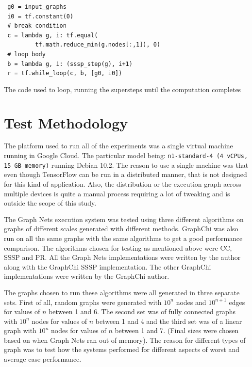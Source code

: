 \documentclass[sigconf,nonacm]{acmart}
\begin{document}
\begin{listing}[ht]
\small{}
\begin{verbatim}
 g0 = input_graphs
 i0 = tf.constant(0)
 # break condition
 c = lambda g, i: tf.equal(
         tf.math.reduce_min(g.nodes[:,1]), 0)
 # loop body
 b = lambda g, i: (sssp_step(g), i+1)
 r = tf.while_loop(c, b, [g0, i0])
\end{verbatim}
\caption{The code used to loop, running the supersteps until the computation completes}
\label{listing:loops}
\end{listing}

\section{Test Methodology}

The platform used to run all of the experiments was a single virtual machine running in Google Cloud. The particular model being: \texttt{n1-standard-4 (4 vCPUs, 15 GB memory)} running Debian 10.2. The reason to use a single machine was that even though TensorFlow can be run in a distributed manner, that is not designed for this kind of application. Also, the distribution or the execution graph across multiple devices is quite a manual process requiring a lot of tweaking and is outside the scope of this study.

The Graph Nets execution system was tested using three different algorithms on graphs of different scales generated with different methods. GraphChi was also run on all the same graphs with the same algorithms to get a good performance comparison. The algorithms chosen for testing as mentioned above were CC, SSSP and PR. All the Graph Nets implementations were written by the author along with the GraphChi SSSP implementation. The other GraphChi implementations were written by the GraphChi author.

The graphs chosen to run these algorithms were all generated in three separate sets. First of all, random graphs were generated with $10^n$ nodes and $10^{n+1}$ edges for values of $n$ between 1 and 6. The second set was of fully connected graphs with $10^n$ nodes for values of $n$ between 1 and 4 and the third set was of a linear graph with $10^n$ nodes for values of $n$ between 1 and 7. (Final sizes were chosen based on when Graph Nets ran out of memory). The reason for different types of graph was to test how the systems performed for different aspects of worst and average case performance.
\end{document}
